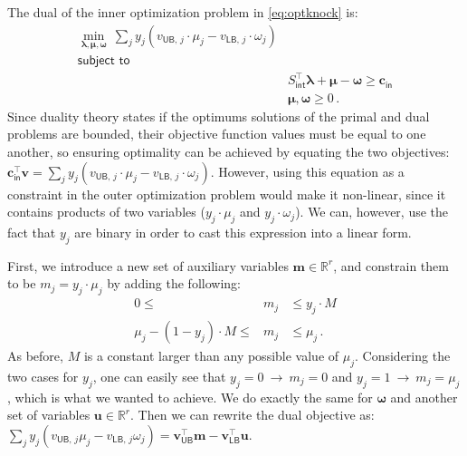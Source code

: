 \documentclass[10pt,a4paper]{article}
\newcommand{\mymatrix}[1]{#1}
\newcommand{\myvector}[1]{{\boldsymbol{#1}}}
\newcommand{\stoichmatint}{\mymatrix{S}_{\mathsf{int}}}
\begin{document}
The dual of the inner optimization problem in \ref{eq:optknock} is:
\begin{eqnarray}
\min_{\myvector{\lambda},\myvector{\mu},\myvector{\omega}} ~\sum_j y_j (v_{\textsf{UB},\,j} \cdot \mu_j - v_{\textsf{LB},\,j} \cdot \omega_j)&\nonumber\\
\textsf{subject to}&\nonumber\\
&\stoichmatint^\top \myvector{\lambda} + \myvector{\mu} - \myvector{\omega} \geq \myvector{c}_\textsf{in} \nonumber\\
&\myvector{\mu}, \myvector{\omega} \geq 0\,.
\end{eqnarray}
Since duality theory states if the optimums solutions of the primal and dual problems are bounded, their objective function values must be equal to one another, so ensuring optimality can be achieved by equating the two objectives: $\myvector{c}_\textsf{in}^\top \myvector{v} = \sum_j y_j (v_{\textsf{UB},\,j} \cdot \mu_j - v_{\textsf{LB},\,j} \cdot \omega_j)$. However, using this equation as a constraint in the outer optimization problem would make it non-linear, since it contains products of two variables ($y_j \cdot \mu_j$ and $y_j \cdot \omega_j$). We can, however, use the fact that $y_j$ are binary in order to cast this expression into a linear form.

First, we introduce a new set of auxiliary variables $\myvector{m} \in \mathbb{R}^r$, and constrain them to be $m_j = y_j \cdot \mu_j$ by adding the following:
\begin{eqnarray}
	0 \leq &m_j& \leq y_j \cdot M \nonumber\\
	\mu_j - (1 - y_j) \cdot M \leq &m_j& \leq \mu_j\,.
\end{eqnarray}
As before, $M$ is a constant larger than any possible value of $\mu_j$. Considering the two cases for $y_j$, one can easily see that $y_j = 0 ~\rightarrow~ m_j = 0$ and $y_j = 1 ~\rightarrow~ m_j = \mu_j$, which is what we wanted to achieve. We do exactly the same for $\myvector{\omega}$ and another set of variables $\myvector{u} \in \mathbb{R}^r$. Then we can rewrite the dual objective as: $\sum_j y_j (v_{\textsf{UB},\,j} \mu_j - v_{\textsf{LB},\,j} \omega_j) = \myvector{v}_\textsf{UB}^\top \myvector{m} - \myvector{v}_\textsf{LB}^\top\myvector{u}$.
\end{document}
